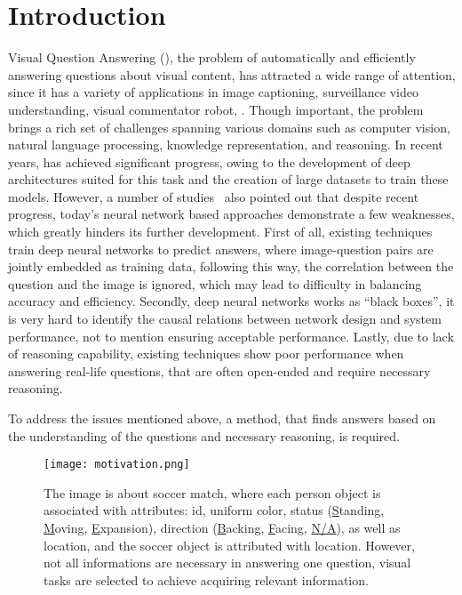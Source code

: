 \section{Introduction}
\label{sec-intro}


Visual Question Answering (\vqa), the
problem of automatically and efficiently answering questions about visual content, has attracted a wide range of attention, since it has a variety of applications in \eg image captioning, surveillance video understanding, visual commentator robot, \etc. 
Though important, the \vqa problem brings a rich set of challenges spanning various domains such as computer vision, natural language processing, knowledge representation, and reasoning. 
In recent years, \vqa has achieved significant
progress, owing to the development of deep architectures suited for this task and the creation of large \vqa datasets to train these models. 
However, a number of studies~\cite{peixi2019,Goyal_2017} also pointed out that despite recent progress, today's neural network based approaches demonstrate a few weaknesses, which greatly hinders its further development. First of all, existing techniques train deep neural networks to predict answers, where image-question pairs are jointly embedded as training data, following this way, the correlation between the question and the image is ignored, which may lead to difficulty in balancing accuracy and efficiency. Secondly, deep neural networks works as ``black boxes'', it is very hard to identify the causal relations between network design and system performance, not to mention ensuring acceptable performance. Lastly, due to lack of reasoning capability, existing techniques show poor performance when answering real-life questions, that are often open-ended and require necessary reasoning. 

To address the issues mentioned above, a method, that finds answers based on the understanding of the questions and necessary reasoning, is required. 


\begin{figure}[tb]
\centering
\texttt{[image: motivation.png]}
\caption{The image is about soccer match, where each person object is associated with attributes: id, uniform color, status (\underline{S}tanding, \underline{M}oving, \underline{E}xpansion), direction (\underline{B}acking, \underline{F}acing, \underline{N/A}), as well as location, and the soccer object is attributed with location. However, not all informations are necessary in answering one question, visual tasks are selected to achieve acquiring relevant information.%
}
\vspace{-4ex}
\label{fig:example}
\end{figure}


